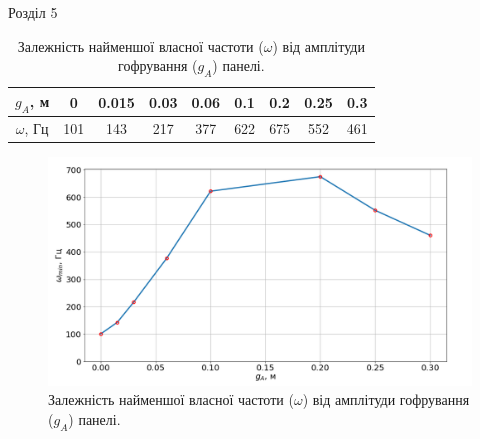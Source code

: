 \documentclass[8pt]{beamer}
\numberwithin{figure}{section}
\numberwithin{equation}{section}
\numberwithin{table}{section}
\begin{document}
\begin{frame}{Розділ 5}
\begin{table}[h!]
\caption{Залежність найменшої власної частоти ($\omega$) від амплітуди гофрування ($g_A$) панелі.}
\centering
 \begin{tabular}{| c | c | c | c | c | c | c | c | c |} 
 \hline
 $g_A$, м & 0 & 0.015 & 0.03 & 0.06 & 0.1 & 0.2 & 0.25 & 0.3 \\ 
  \hline
 $\omega$, Гц & 101 & 143 & 217 & 377 & 622 & 675 & 552 & 461\\
   \hline
\end{tabular}
\end{table}

\begin{figure}
	\includegraphics[scale=0.25]{pic/corrugated_ampl_linear.png}
		\caption{Залежність найменшої власної частоти ($\omega$) від амплітуди гофрування ($g_A$) панелі.}
\end{figure}
\end{frame}
\end{document}
